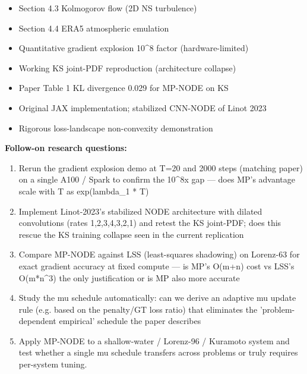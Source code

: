 \begin{itemize}[leftmargin=1.4em,itemsep=0.2em,topsep=0.2em]
\item Section 4.3 Kolmogorov flow (2D NS turbulence)
\item Section 4.4 ERA5 atmospheric emulation
\item Quantitative gradient explosion 10\textasciicircum{}8 factor (hardware-limited)
\item Working KS joint-PDF reproduction (architecture collapse)
\item Paper Table 1 KL divergence 0.029 for MP-NODE on KS
\item Original JAX implementation; stabilized CNN-NODE of Linot 2023
\item Rigorous loss-landscape non-convexity demonstration
\end{itemize}\noindent\textbf{Follow-on research questions:}
\begin{enumerate}[leftmargin=1.6em,itemsep=0.2em,topsep=0.2em,label=Q\arabic*.]
\item Rerun the gradient explosion demo at T=20 and 2000 steps (matching paper) on a single A100 / Spark to confirm the 10\textasciicircum{}8x gap --- does MP's advantage scale with T as exp(lambda\_1 * T)
\item Implement Linot-2023's stabilized NODE architecture with dilated convolutions (rates 1,2,3,4,3,2,1) and retest the KS joint-PDF; does this rescue the KS training collapse seen in the current replication
\item Compare MP-NODE against LSS (least-squares shadowing) on Lorenz-63 for exact gradient accuracy at fixed compute --- is MP's O(m+n) cost vs LSS's O(m*n\textasciicircum{}3) the only justification or is MP also more accurate
\item Study the mu schedule automatically: can we derive an adaptive mu update rule (e.g. based on the penalty/GT loss ratio) that eliminates the 'problem-dependent empirical' schedule the paper describes
\item Apply MP-NODE to a shallow-water / Lorenz-96 / Kuramoto system and test whether a single mu schedule transfers across problems or truly requires per-system tuning.
\end{enumerate}

